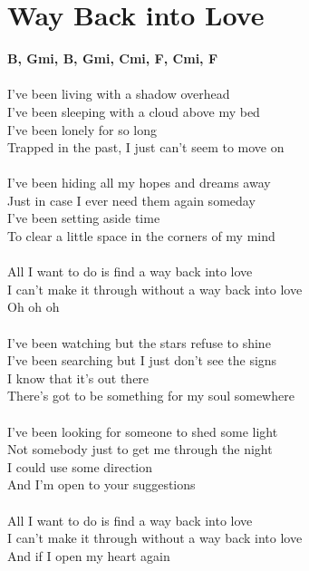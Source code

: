 \section{Way Back into Love}
\footnotesize\textbf{B\be, Gmi, B\be , Gmi, Cmi, F, Cmi, F}\\
\\
\normalsize
\color{red}
I've been living with a shadow overhead\\
I've been sleeping with a cloud above my bed\\
I've been lonely for so long\\
Trapped in the past, I just can't  seem to move on\\
\\
\color{blue}
I've been hiding all my hopes and dreams away\\
Just in case I ever need them again someday\\
I've been setting aside time\\
To clear a little space in the corners of my mind\\
\\
\color{black}
All I want to do is find a way back into love\\
I can't make it through without a way back into love\\
Oh oh oh\\
\\
\color{red}
I've been watching but the stars refuse to shine\\
I've been searching but I just don't see the signs\\
I know that it's out there\\
There's got to be something for my soul somewhere\\
\\
\color{blue}
I've been looking for someone to shed some light\\
Not somebody just to get me through the night\\
I could use some direction\\
And I'm open to your suggestions\\
\\
\color{black}
All I want to do is find a way back into love\\
I can't make it through without a way back into love\\
And if I open my heart again\\
